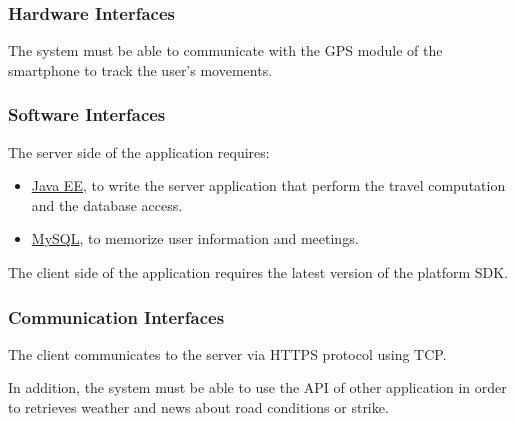 \subsubsection{Hardware Interfaces}
The system must be able to communicate with the GPS module of the smartphone to track the user's movements.

\subsubsection{Software Interfaces}
The server side of the application requires: 
\begin{itemize}
	\item \href{http://www.oracle.com/technetwork/java/javaee/overview/index.html}{Java EE}, to write the server application that perform the travel computation and the database access.
	\item \href{https://dev.mysql.com/}{MySQL}, to memorize user information and meetings.
\end{itemize}
The client side of the application requires the latest version of the platform SDK.

\subsubsection{Communication Interfaces}
The client communicates to the server via HTTPS protocol using TCP.\par
In addition, the system must be able to use the API of other application in order to retrieves weather and news about road conditions or strike.
